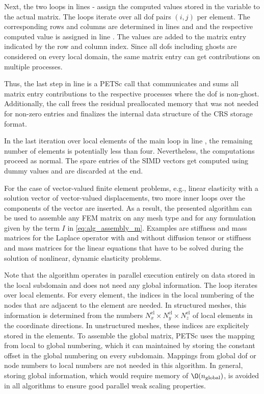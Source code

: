 Next, the two loops in lines  -   assign the computed values stored in the variable  to the actual matrix. The loops iterate over all dof pairs $(i,j)$ per element. The corresponding rows and columns are determined in lines  and  and the respective computed value is assigned in line . 
The values are added to the matrix entry indicated by the row and column index. Since all dofs including ghosts are considered on every local domain, the same matrix entry can get contributions on multiple processes.

Thus, the last step in line  is a PETSc call that communicates and sums all matrix entry contributions to the respective processes where the dof is non-ghost. Additionally, the call frees the residual preallocated memory that was not needed for non-zero entries and finalizes the internal data structure of the CRS storage format.

In the last iteration over local elements of the main loop in line , the remaining number of elements is potentially less than four. Nevertheless, the computations proceed as normal. The spare entries of the SIMD vectors get computed using dummy values and are discarded at the end.

For the case of vector-valued finite element problems, e.g., linear elasticity with a solution vector of vector-valued displacements, two more inner loops over the components of the vector are inserted. As a result, the presented algorithm can be used to assemble any FEM matrix on any mesh type and for any formulation given by the term $I$ in \cref{eq:alg_assembly_m}.
Examples are stiffness and mass matrices for the Laplace operator with and without diffusion tensor or stiffness and mass matrices for the linear equations that have to be solved during the solution of nonlinear, dynamic elasticity problems.

Note that the algorithm operates in parallel execution entirely on data stored in the local subdomain and does not need any global information. The loop iterates over local elements. For every element, the indices in the local numbering of the nodes that are adjacent to the element are needed. In structured meshes, this information is determined from the numbers $N^\text{el}_x \times N^\text{el}_y \times N^\text{el}_z$ of local elements in the coordinate directions. In unstructured meshes, these indices are explicitely stored in the elements. To assemble the global matrix, PETSc uses the mapping from local to global numbering, which it can maintained by storing the constant offset in the global numbering on every subdomain. Mappings from global dof or node numbers to local numbers are not needed in this algorithm. 
In general, storing global information, which would require memory of $\O(n_\text{global})$, is avoided in all algorithms to ensure good parallel weak scaling properties.

